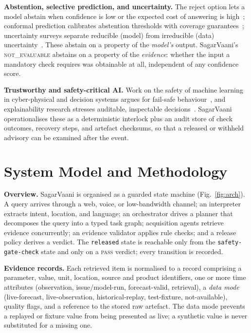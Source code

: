 \documentclass[conference]{IEEEtran}
\newcommand{\NE}{\textsc{not\_evaluable}}
\newcommand{\PASS}{\textsc{pass}}
\begin{document}
\textbf{Abstention, selective prediction, and uncertainty.} The reject option lets a model abstain when confidence is low or the expected cost of answering is high~\cite{hendrickx2024reject}; conformal prediction calibrates abstention thresholds with coverage guarantees~\cite{angelopoulos2023conformal}; uncertainty surveys separate reducible (model) from irreducible (data) uncertainty~\cite{gawlikowski2023uncertainty,hullermeier2021aleatoric}. These abstain on a property of the \emph{model's} output. SagarVaani's \NE{} abstains on a property of the \emph{evidence}: whether the input a mandatory check requires was obtainable at all, independent of any confidence score.

\textbf{Trustworthy and safety-critical AI.} Work on the safety of machine learning in cyber-physical and decision systems argues for fail-safe behaviour~\cite{varshney2017safety}, and explainability research stresses auditable, inspectable decisions~\cite{arrieta2020xai,ali2023xai}. SagarVaani operationalises these as a deterministic interlock plus an audit store of check outcomes, recovery steps, and artefact checksums, so that a released or withheld advisory can be examined after the event.

\section{System Model and Methodology}
\label{sec:method}
\textbf{Overview.} SagarVaani is organised as a guarded state machine (Fig.~\ref{fig:arch}). A query arrives through a web, voice, or low-bandwidth channel; an interpreter extracts intent, location, and language; an orchestrator drives a planner that decomposes the query into a typed task graph; acquisition agents retrieve evidence concurrently; an evidence validator applies rule checks; and a release policy derives a verdict. The \texttt{released} state is reachable only from the \texttt{safety-gate-check} state and only on a \PASS{} verdict; every transition is recorded.

\textbf{Evidence records.} Each retrieved item is normalised to a record comprising a parameter, value, unit, location, source and product identifiers, one or more time attributes (observation, issue/model-run, forecast-valid, retrieval), a \emph{data mode} (live-forecast, live-observation, historical-replay, test-fixture, not-available), quality flags, and a reference to the stored raw artefact. The data mode prevents a replayed or fixture value from being presented as live; a synthetic value is never substituted for a missing one.
\end{document}
